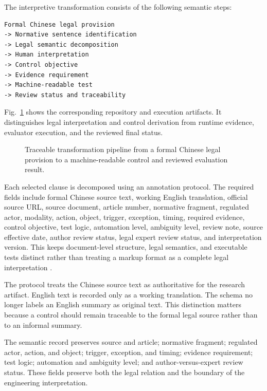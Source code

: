 \documentclass[10pt,journal]{IEEEtran}
\begin{document}
The interpretive transformation consists of the following semantic steps:

\begin{lstlisting}
Formal Chinese legal provision
-> Normative sentence identification
-> Legal semantic decomposition
-> Human interpretation
-> Control objective
-> Evidence requirement
-> Machine-readable test
-> Review status and traceability
\end{lstlisting}

Fig.~\ref{fig:transformation-pipeline} shows the corresponding repository and execution artifacts. It distinguishes legal interpretation and control derivation from runtime evidence, evaluator execution, and the reviewed final status.

\begin{figure}[!t]
\centering
\resizebox{0.82\textwidth}{!}{}
\caption{Traceable transformation pipeline from a formal Chinese legal provision to a machine-readable control and reviewed evaluation result.}
\label{fig:transformation-pipeline}
\end{figure}

Each selected clause is decomposed using an annotation protocol. The required fields include formal Chinese source text, working English translation, official source URL, source document, article number, normative fragment, regulated actor, modality, action, object, trigger, exception, timing, required evidence, control objective, test logic, automation level, ambiguity level, review note, source effective date, author review status, legal expert review status, and interpretation version. This keeps document-level structure, legal semantics, and executable tests distinct rather than treating a markup format as a complete legal interpretation \cite{akomaNtoso2018,legalRuleMl2021}.

The protocol treats the Chinese source text as authoritative for the research artifact. English text is recorded only as a working translation. The schema no longer labels an English summary as original text. This distinction matters because a control should remain traceable to the formal legal source rather than to an informal summary.

The semantic record preserves source and article; normative fragment; regulated actor, action, and object; trigger, exception, and timing; evidence requirement; test logic; automation and ambiguity level; and author-versus-expert review status. These fields preserve both the legal relation and the boundary of the engineering interpretation.
\end{document}
